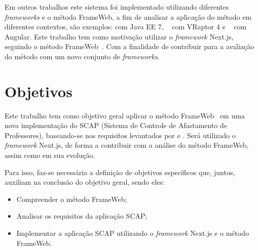 Em outros trabalhos este sistema foi implementado utilizando diferentes \textit{frameworks} e o método FrameWeb, a fim de analisar a aplicação do método em diferentes contextos, são exemplos:  com Java EE 7, ~ com VRaptor 4 e ~ com Angular. 
Este trabalho tem como motivação utilizar o \textit{framework} Next.js, seguindo o método FrameWeb~\cite{souza:2007}. Com a finalidade de contribuir para a avaliação do método com um novo conjunto de \textit{frameworks}.


\section{Objetivos}
\label{sec-intro-obj}




Este trabalho tem como objetivo geral aplicar o método FrameWeb~\cite{souza:2007} em uma nova implementação do SCAP (Sistema de Controle de Afastamento de Professores),
baseando-se nos requisitos levantados por \cite{duarte:2014} e \cite{prado:2015}. Será utilizado o \textit{framework} Next.js, de forma a contribuir com a análise do método FrameWeb, assim como em sua evolução.

Para isso, faz-se necessária a definição de objetivos específicos que, juntos, auxiliam na conclusão do objetivo geral, sendo eles:
\begin{itemize}
    \item Compreender o método FrameWeb;
    \item Analisar os requisitos da aplicação SCAP;
    \item Implementar a aplicação SCAP utilizando o \textit{framework} Next.js e o método FrameWeb.
\end{itemize}


